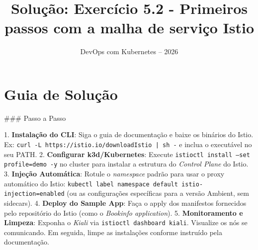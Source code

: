 \documentclass[11pt,a4paper]{article}
\title{\color{secondary}\Huge\textbf{Solução: Exercício 5.2 - Primeiros passos com a malha de serviço Istio}}
\author{\color{primary}DevOps com Kubernetes -- 2026}
\date{}
\begin{document}
\maketitle

\section*{\color{primary}Guia de Solução}
\begin{tcolorbox}[colback=green!5!white,colframe=green!60!black,title=Resolução Passo a Passo]
### Passo a Passo

1. \textbf{Instalação do CLI}: Siga o guia de documentação e baixe os binários do Istio. Ex: \texttt{curl -L https://istio.io/downloadIstio | sh -} e inclua o executável no seu PATH.
2. \textbf{Configurar k3d/Kubernetes}: Execute \texttt{istioctl install --set profile=demo -y} no cluster para instalar a estrutura do \textit{Control Plane} do Istio.
3. \textbf{Injeção Automática}: Rotule o \textit{namespace} padrão para usar o proxy automático do Istio: \texttt{kubectl label namespace default istio-injection=enabled} (ou as configurações específicas para a versão Ambient, sem sidecars).
4. \textbf{Deploy do Sample App}: Faça o apply dos manifestos fornecidos pelo repositório do Istio (como o \textit{Bookinfo application}).
5. \textbf{Monitoramento e Limpeza}: Exponha o \textit{Kiali} via \texttt{istioctl dashboard kiali}. Visualize os nós se comunicando. Em seguida, limpe as instalações conforme instruído pela documentação.
\end{tcolorbox}
\end{document}
